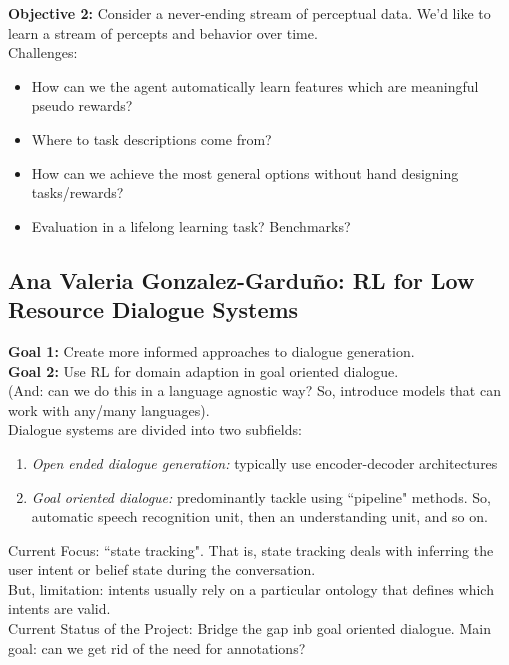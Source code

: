{\bf Objective 2:} Consider a never-ending stream of perceptual data. We'd like to learn a stream of percepts and behavior over time. \\

Challenges:
\begin{itemize}
    \item How can we the agent automatically learn features which are meaningful pseudo rewards?
    \item Where to task descriptions come from?
    \item How can we achieve the most general options without hand designing tasks/rewards?
    \item Evaluation in a lifelong learning task? Benchmarks?
\end{itemize}


\spacerule
\subsection{Ana Valeria Gonzalez-Garduño: RL for Low Resource Dialogue Systems}

{\bf Goal 1:} Create more informed approaches to dialogue generation. \\

{\bf Goal 2:} Use RL for domain adaption in goal oriented dialogue. \\

(And: can we do this in a language agnostic way? So, introduce models that can work with any/many languages). \\

Dialogue systems are divided into two subfields:
\begin{enumerate}
    \item {\it Open ended dialogue generation:} typically use encoder-decoder architectures
    \item {\it Goal oriented dialogue:} predominantly tackle using ``pipeline" methods. So, automatic speech recognition unit, then an understanding unit, and so on.
\end{enumerate}

Current Focus: ``state tracking". That is, state tracking deals with inferring the user intent or belief state during the conversation. \\

But, limitation: intents usually rely on a particular ontology that defines which intents are valid. \\

Current Status of the Project: Bridge the gap inb goal oriented dialogue. Main goal: can we get rid of the need for annotations? \\

